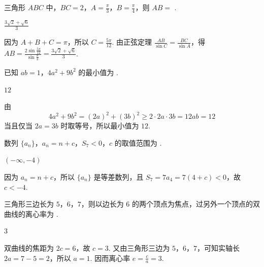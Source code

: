 \begin{problem}
三角形 \(ABC\) 中，\(BC=2\)，\(A=\frac{\pi}{3}\)，\(B=\frac{\pi}{4}\)，则 \(AB=\)\fillinblank{} .
\end{problem}

\begin{answer}
\(\frac{3\sqrt2+\sqrt6}{3}\)
\end{answer}

\begin{solution}
因为 \(A+B+C=\pi\)，所以 \(C=\frac{5\pi}{12}\). 由正弦定理 \(\frac{AB}{\sin C}=\frac{BC}{\sin A}\)，得 \(AB=\frac{2\sin\frac{5\pi}{12}}{\sin\frac{\pi}{3}}=\frac{3\sqrt2+\sqrt6}{3}\).
\end{solution}

\begin{problem}
已知 \(ab=1\)，\(4a^2+9b^2\) 的最小值为\fillinblank{} .
\end{problem}

\begin{answer}
\(12\)
\end{answer}

\begin{solution}
由
\[
4a^2+9b^2=\left(2a\right)^2+\left(3b\right)^2\ge 2\cdot 2a\cdot 3b=12ab=12
\]
当且仅当 \(2a=3b\) 时取等号，所以最小值为 \(12\).
\end{solution}

\begin{problem}
数列 \(\{a_n\}\)，\(a_n=n+c\)，\(S_7<0\)，\(c\) 的取值范围为\fillinblank{} .
\end{problem}

\begin{answer}
\(\left(-\infty,-4\right)\)
\end{answer}

\begin{solution}
因为 \(a_n=n+c\)，所以 \(\{a_n\}\) 是等差数列，且 \(S_7=7a_4=7(4+c)<0\)，故 \(c<-4\).
\end{solution}

\begin{problem}
三角形三边长为 \(5\)，\(6\)，\(7\)，则以边长为 \(6\) 的两个顶点为焦点，过另外一个顶点的双曲线的离心率为\fillinblank{} .
\end{problem}

\begin{answer}
\(3\)
\end{answer}

\begin{solution}
双曲线的焦距为 \(2c=6\)，故 \(c=3\). 又由三角形三边为 \(5\)，\(6\)，\(7\)，可知实轴长 \(2a=7-5=2\)，所以 \(a=1\). 因而离心率 \(e=\frac{c}{a}=3\).
\end{solution}

